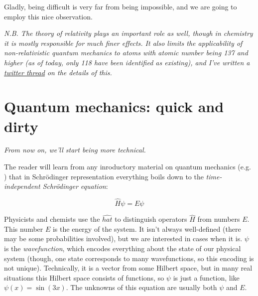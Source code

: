\documentclass{article}
\begin{document}
Gladly, being difficult is very far from being impossible, and we are going to employ this nice observation.

\textit{N.B. The theory of relativity plays an important role as well, though in chemistry it is mostly responsible for much finer effects. It also limits the applicability of non-relativistic quantum mechanics to atoms with atomic number being 137 and higher (as of today, only 118 have been identified as existing), and I've written a \href{https://twitter.com/lisyarus/status/1189227697605660673?s=20}{twitter thread} on the details of this.}

\newpage

\section{Quantum mechanics: quick and dirty} \label{sec:qm}

\textit{From now on, we'll start being more technical.}

The reader will learn from any inroductory material on quantum mechanics (e.g. \cite{ref:atkins}) that in Schrödinger representation everything boils down to the \textit{time-independent Schrödinger equation}:

\begin{equation} \label{eq:shrod} \hat H \psi = E \psi \end{equation}

Physicists and chemists use the \(\widehat{hat}\) to distinguish operators \(\hat H\) from numbers \(E\). This number \(E\) is the energy of the system. It isn't always well-defined (there may be some probabilities involved), but we are interested in cases when it is. \(\psi\) is the \textit{wavefunction}, which encodes everything about the state of our physical system (though, one state corresponds to many wavefunctions, so this encoding is not unique). Technically, it is a vector from some Hilbert space, but in many real situations this Hilbert space consists of functions, so \(\psi\) is just a function, like \(\psi(x) = \sin(3x)\). The unknowns of this equation are usually both \(\psi\) and \(E\).
\end{document}
